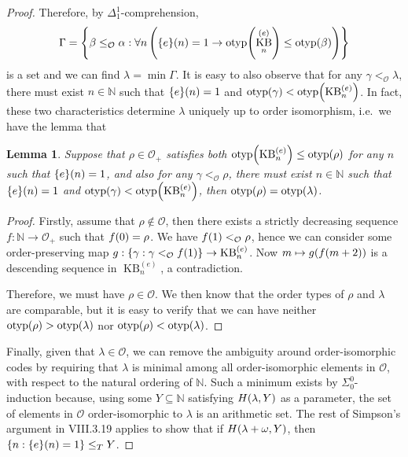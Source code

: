 \documentclass[11pt]{article}
\theoremstyle{plain}
\newtheorem*{lemma*}{Lemma}
\theoremstyle{definition}
\DeclareMathOperator{\otyp}{otyp}
\DeclareMathOperator{\KB}{KB}
\begin{document}
\begin{proof}
    Therefore, by $\Delta^1_1$-comprehension,
    \[\Gamma = \left\{\beta \leq_\mathcal{O} \alpha : \forall n \left(\mleft\{e\mright\}\mleft(n\mright) = 1 \rightarrow \otyp\mleft(\KB^{(e)}_n\mright) \leq \otyp\mleft(\beta\mright)\right)\right\}\]
    is a set and we can find $\lambda = \min \Gamma$. It is easy to also observe that for any $\gamma <_\mathcal{O} \lambda$, there must exist $n \in \mathbb{N}$ such that $\mleft\{e\mright\}\mleft(n\mright) = 1$ and $\otyp\mleft(\gamma\mright) < \otyp\mleft(\KB^{(e)}_n\mright)$. In fact, these two characteristics determine $\lambda$ uniquely up to order isomorphism, i.e.\ we have the lemma that

    \begin{lemma*}
        Suppose that $\rho \in \mathcal{O}_+$ satisfies both $\otyp\mleft(\KB^{(e)}_n\mright) \leq \otyp\mleft(\rho\mright)$ for any $n$ such that $\mleft\{e\mright\}\mleft(n\mright) = 1$, and also for any $\gamma <_\mathcal{O} \rho$, there must exist $n \in \mathbb{N}$ such that $\mleft\{e\mright\}\mleft(n\mright) = 1$ and $\otyp\mleft(\gamma\mright) < \otyp\mleft(\KB^{(e)}_n\mright)$, then $\otyp\mleft(\rho\mright) = \otyp\mleft(\lambda\mright)$.
    \end{lemma*}

    \begin{proof}
        Firstly, assume that $\rho \not\in \mathcal{O}$, then there exists a strictly decreasing sequence $f : \mathbb{N} \rightarrow \mathcal{O}_+$ such that $f\mleft(0\mright) = \rho$. We have $f\mleft(1\mright) <_\mathcal{O} \rho$, hence we can consider some order-preserving map $g : \left\{\gamma : \gamma <_\mathcal{O} f\mleft(1\mright)\right\} \rightarrow \KB^{(e)}_n$. Now $m \mapsto g\mleft(f\mleft(m + 2\mright)\mright)$ is a descending sequence in $\KB^{(e)}_n$, a contradiction.

        Therefore, we must have $\rho \in \mathcal{O}$. We then know that the order types of $\rho$ and $\lambda$ are comparable, but it is easy to verify that we can have neither $\otyp\mleft(\rho\mright) > \otyp\mleft(\lambda\mright)$ nor $\otyp\mleft(\rho\mright) < \otyp\mleft(\lambda\mright)$.
    \end{proof}

    Finally, given that $\lambda \in \mathcal{O}$, we can remove the ambiguity around order-isomorphic codes by requiring that $\lambda$ is minimal among all order-isomorphic elements in $\mathcal{O}$, with respect to the natural ordering of $\mathbb{N}$. Such a minimum exists by $\Sigma^0_0$-induction because, using some $Y \subseteq \mathbb{N}$ satisfying $H\mleft(\lambda, Y\mright)$ as a parameter, the set of elements in $\mathcal{O}$ order-isomorphic to $\lambda$ is an arithmetic set. The rest of Simpson's argument in VIII.3.19 applies to show that if $H\mleft(\lambda + \omega, Y\mright)$, then $\left\{n : \mleft\{e\mright\}\mleft(n\mright) = 1\right\} \leq_T Y$.


\end{proof}
\end{document}
